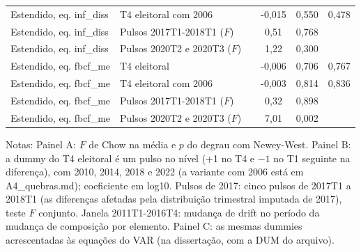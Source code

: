 \begin{table}[htbp]
\begin{tabular}{lllccc}
Estendido, eq. inf\_diss & T4 eleitoral com 2006 & & -0{,}015 & 0{,}550 & 0{,}478 \\
Estendido, eq. inf\_diss & Pulsos 2017T1-2018T1 ($F$) & & 0{,}51 & 0{,}768 &  \\
Estendido, eq. inf\_diss & Pulsos 2020T2 e 2020T3 ($F$) & & 1{,}22 & 0{,}300 &  \\
Estendido, eq. fbcf\_me & T4 eleitoral & & -0{,}006 & 0{,}706 & 0{,}767 \\
Estendido, eq. fbcf\_me & T4 eleitoral com 2006 & & -0{,}003 & 0{,}814 & 0{,}836 \\
Estendido, eq. fbcf\_me & Pulsos 2017T1-2018T1 ($F$) & & 0{,}32 & 0{,}898 &  \\
Estendido, eq. fbcf\_me & Pulsos 2020T2 e 2020T3 ($F$) & & 7{,}01 & 0{,}002 &  \\
\bottomrule
\end{tabular}
\begin{minipage}{0.97\linewidth}\footnotesize
\medskip Notas: Painel A: $F$ de Chow na m\'edia e $p$ do degrau com Newey-West. Painel B: a dummy do T4 eleitoral \'e um pulso no n\'ivel (+1 no T4 e $-1$ no T1 seguinte na diferen\c{c}a), com 2010, 2014, 2018 e 2022 (a variante com 2006 est\'a em A4\_quebras.md); coeficiente em log10. Pulsos de 2017: cinco pulsos de 2017T1 a 2018T1 (as diferen\c{c}as afetadas pela distribui\c{c}\~ao trimestral imputada de 2017), teste $F$ conjunto. Janela 2011T1-2016T4: mudan\c{c}a de drift no per\'iodo da mudan\c{c}a de composi\c{c}\~ao por elemento. Painel C: as mesmas dummies acrescentadas \`as equa\c{c}\~oes do VAR (na disserta\c{c}\~ao, com a DUM do arquivo).
\end{minipage}
\end{table}

